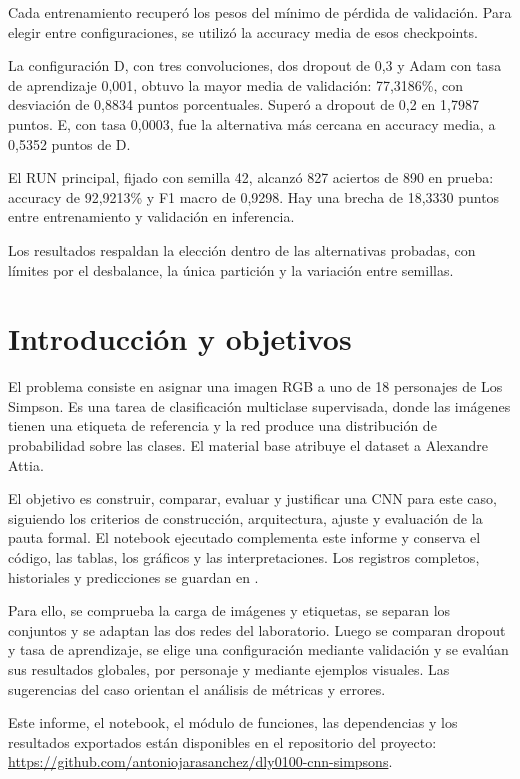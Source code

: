 \documentclass[11pt,letterpaper]{article}
\newcommand{\nombre}[1]{\texttt{\detokenize{#1}}}
\begin{document}
Cada entrenamiento recuperó los pesos del mínimo de pérdida de validación. Para elegir entre configuraciones, se utilizó la accuracy media de esos checkpoints.

La configuración D, con tres convoluciones, dos dropout de 0,3 y Adam con tasa de aprendizaje 0,001, obtuvo la mayor media de validación: 77,3186\%, con desviación de 0,8834 puntos porcentuales. Superó a dropout de 0,2 en 1,7987 puntos. E, con tasa 0,0003, fue la alternativa más cercana en accuracy media, a 0,5352 puntos de D.

El RUN principal, fijado con semilla 42, alcanzó 827 aciertos de 890 en prueba: accuracy de 92,9213\% y F1 macro de 0,9298. Hay una brecha de 18,3330 puntos entre entrenamiento y validación en inferencia.

Los resultados respaldan la elección dentro de las alternativas probadas, con límites por el desbalance, la única partición y la variación entre semillas.

\section{Introducción y objetivos}
El problema consiste en asignar una imagen RGB a uno de 18 personajes de Los Simpson. Es una tarea de clasificación multiclase supervisada, donde las imágenes tienen una etiqueta de referencia y la red produce una distribución de probabilidad sobre las clases. El material base atribuye el dataset a Alexandre Attia.

El objetivo es construir, comparar, evaluar y justificar una CNN para este caso, siguiendo los criterios de construcción, arquitectura, ajuste y evaluación de la pauta formal. El notebook ejecutado complementa este informe y conserva el código, las tablas, los gráficos y las interpretaciones. Los registros completos, historiales y predicciones se guardan en \nombre{resultados/resultados.json}.

Para ello, se comprueba la carga de imágenes y etiquetas, se separan los conjuntos y se adaptan las dos redes del laboratorio. Luego se comparan dropout y tasa de aprendizaje, se elige una configuración mediante validación y se evalúan sus resultados globales, por personaje y mediante ejemplos visuales. Las sugerencias del caso orientan el análisis de métricas y errores.

Este informe, el notebook, el módulo de funciones, las dependencias y los resultados exportados están disponibles en el repositorio del proyecto: \url{https://github.com/antoniojarasanchez/dly0100-cnn-simpsons}.
\end{document}
